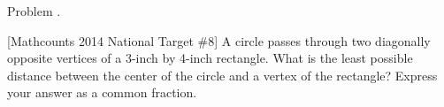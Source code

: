 \documentclass[9pt]{beamer}
\newcounter{problem}[section]
\begin{document}
\begin{frame}[t, fragile]{Problem \thesection.\theproblem}
    \begin{block}{}[Mathcounts 2014 National Target \#8]
     A circle passes through two diagonally opposite vertices of a 3-inch by 4-inch rectangle. What is the least possible distance between the center of the circle and a vertex of the rectangle? Express your answer as a common fraction. 
	
    \end{block}
\end{frame}
\end{document}
